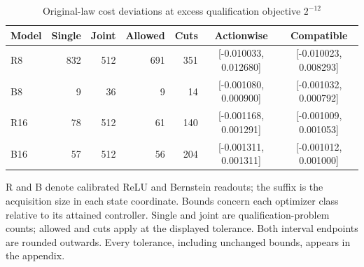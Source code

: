 \begin{table}[htbp]
\centering
\caption{Original-law cost deviations at excess qualification objective $2^{-12}$}\label{tab:compatibility84}
{\small\setlength{\tabcolsep}{3pt}
\begin{tabular}{lrrrrcc}
\hline
Model & Single & Joint & Allowed & Cuts & Actionwise & Compatible \\
\hline
R8 & 832 & 512 & 691 & 351 & [-0.010033, 0.012680] & [-0.010023, 0.008293] \\
B8 & 9 & 36 & 9 & 14 & [-0.001080, 0.000900] & [-0.001032, 0.000792] \\
R16 & 78 & 512 & 61 & 140 & [-0.001168, 0.001291] & [-0.001009, 0.001053] \\
B16 & 57 & 512 & 56 & 204 & [-0.001311, 0.001311] & [-0.001012, 0.001000] \\
\hline
\end{tabular}}
\par\smallskip
{\footnotesize R and B denote calibrated ReLU and Bernstein readouts; the suffix is the acquisition size in each state coordinate. Bounds concern each optimizer class relative to its attained controller. Single and joint are qualification-problem counts; allowed and cuts apply at the displayed tolerance. Both interval endpoints are rounded outwards. Every tolerance, including unchanged bounds, appears in the appendix.}
\end{table}
